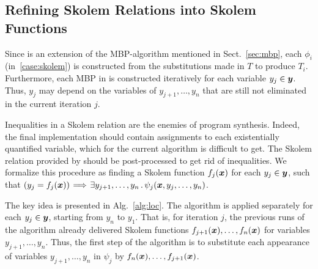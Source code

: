 \skolemcases


\subsection{Refining Skolem Relations into Skolem Functions}
\label{sec:new}

\localfactoralg


Since \aeval is an extension of the MBP-algorithm mentioned in Sect.~\ref{sec:mbp},
each $\phi_i$ (in~\eqref{case:skolem}) is constructed from the substitutions made in $T$ to produce $T_{i}$.
Furthermore, 
%
each MBP in \aeval is constructed iteratively for each variable $y_j \in \vy$.
Thus, $y_j$ may depend on the variables of $y_{j+1},\ldots, y_{n}$ that are still not eliminated in the current iteration $j$.

Inequalities in a Skolem relation are the enemies of program synthesis.
Indeed, the final implementation should contain assignments to each
existentially quantified variable, which for the current algorithm is difficult to
get.
The Skolem relation provided by \aeval should be post-processed to get rid of inequalities.
We formalize this procedure as finding a Skolem function $f_j(\vx)$ for each $y_j\in \vy$, such that $(y_j = f_j(\vx)) \!\implies\! \exists y_{j+1},\ldots,y_{n} \such \psi_j(\vx,y_{j},\ldots,y_{n})$.

The key idea is presented in Alg.~\ref{alg:loc}.
The algorithm is applied separately for each $y_j \in \vy$, starting from $y_n$ to $y_1$.
That is, for iteration $j$, the previous runs of the algorithm  already delivered Skolem functions $f_{j+1}(\vx),\ldots,f_{n}(\vx)$ for variables $y_{j+1},\ldots,y_n$.
Thus, the first step of the algorithm is to substitute each appearance of variables $y_{j+1},\ldots, y_{n}$ in $\psi_j$ by $f_{n}(\vx),\ldots,f_{j+1}(\vx)$.

